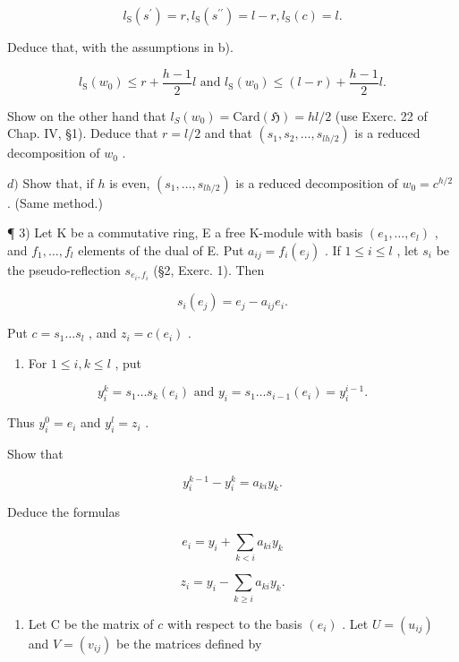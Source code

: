 \[
l _ {\mathrm{S}} (s ^ {\prime}) = r, l _ {\mathrm{S}} (s ^ {\prime \prime}) = l - r, l _ {\mathrm{S}} (c) = l.
\]

Deduce that, with the assumptions in b).

\[
l _ {\mathrm{S}} (w _ {0}) \leqslant r + \frac {h - 1}{2} l \text { and } l _ {\mathrm{S}} (w _ {0}) \leqslant (l - r) + \frac {h - 1}{2} l.
\]

Show on the other hand that \(l_{S}(w_0) = \mathrm{Card}(\mathfrak{H}) = hl / 2\) (use Exerc. 22 of Chap. IV, §1). Deduce that \(r = l / 2\) and that \((s_1, s_2, \ldots, s_{lh / 2})\) is a reduced decomposition of \(w_0\) .

\(d)\) Show that, if \(h\) is even, \((s_1,\ldots ,s_{lh / 2})\) is a reduced decomposition of \(w_{0} = c^{h / 2}\) . (Same method.)

¶ 3) Let K be a commutative ring, E a free K-module with basis \((e_1, \ldots, e_l)\) , and \(f_1, \ldots, f_l\) elements of the dual of E. Put \(a_{ij} = f_i(e_j)\) . If \(1 \leqslant i \leqslant l\) , let \(s_i\) be the pseudo-reflection \(s_{e_i, f_i}\) (\S 2, Exerc. 1). Then

\[
s _ {i} (e _ {j}) = e _ {j} - a _ {i j} e _ {i}.
\]

Put \(c = s_1 \ldots s_l\) , and \(z_i = c(e_i)\) .

\begin{enumerate}
\def\labelenumi{\alph{enumi})}
\tightlist
\item
  For \(1 \leqslant i, k \leqslant l\) , put
\end{enumerate}

\[
y _ {i} ^ {k} = s _ {1} \dots s _ {k} (e _ {i}) \text { and } y _ {i} = s _ {1} \dots s _ {i - 1} (e _ {i}) = y _ {i} ^ {i - 1}.
\]

Thus \(y_{i}^{0} = e_{i}\) and \(y_{i}^{l} = z_{i}\) .

Show that

\[
y _ {i} ^ {k - 1} - y _ {i} ^ {k} = a _ {k i} y _ {k}.
\]

Deduce the formulas

\[
e _ {i} = y _ {i} + \sum_ {k <   i} a _ {k i} y _ {k}
\]

\[
z _ {i} = y _ {i} - \sum_ {k \geqslant i} a _ {k i} y _ {k}.
\]

\begin{enumerate}
\def\labelenumi{\alph{enumi})}
\setcounter{enumi}{1}
\tightlist
\item
  Let C be the matrix of \(c\) with respect to the basis \((e_i)\) . Let \(U = (u_{ij})\) and \(V = (v_{ij})\) be the matrices defined by
\end{enumerate}

